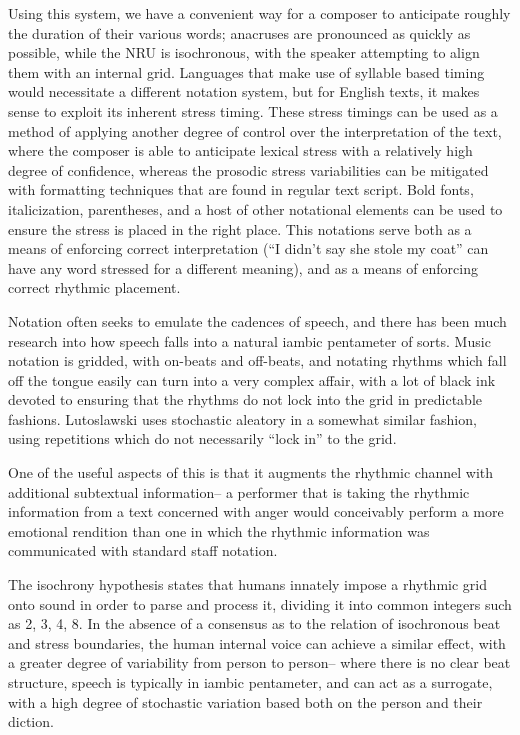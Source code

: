Using this system, we have a convenient way for a composer to anticipate roughly the duration of their various words; anacruses are pronounced as quickly as possible, while the NRU is isochronous, with the speaker attempting to align them with an internal grid. 
Languages that make use of syllable based timing would necessitate a different notation system, but for English texts, it makes sense to exploit its inherent stress timing. 
These stress timings can be used as a method of applying another degree of control over the interpretation of the text, where the composer is able to anticipate lexical stress with a relatively high degree of confidence, whereas the prosodic stress variabilities can be mitigated with formatting techniques that are found in regular text script.
Bold fonts, italicization, parentheses, and a host of other notational elements can be used to ensure the stress is placed in the right place. 
This notations serve both as a means of enforcing correct interpretation (``I didn't say she stole my coat'' can have any word stressed for a different meaning), and as a means of enforcing correct rhythmic placement.

Notation often seeks to emulate the cadences of speech, and there has been much research into how speech falls into a natural iambic pentameter of sorts. 
Music notation is gridded, with on-beats and off-beats, and notating rhythms which fall off the tongue easily can turn into a very complex affair, with a lot of black ink devoted to ensuring that the rhythms do not lock into the grid in predictable fashions. 
Lutoslawski uses stochastic aleatory in a somewhat similar fashion, using repetitions which do not necessarily ``lock in'' to the grid.

One of the useful aspects of this is that it augments the rhythmic channel with additional subtextual information-- a performer that is taking the rhythmic information from a text concerned with anger would conceivably perform a more emotional rendition than one in which the rhythmic information was communicated with standard staff notation.

The isochrony hypothesis states that humans innately impose a rhythmic grid onto sound in order to parse and process it, dividing it into common integers such as 2, 3, 4, 8. 
In the absence of a consensus as to the relation of isochronous beat and stress boundaries, the human internal voice can achieve a similar effect, with a greater degree of variability from person to person-- 
where there is no clear beat structure, speech is typically in iambic pentameter, and can act as a surrogate, with a high degree of stochastic variation based both on the person and their diction. 

